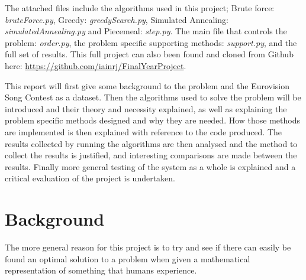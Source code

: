 \documentclass[12pt]{report}
\begin{document}
The attached files include the algorithms used in this project; Brute force: \textit{bruteForce.py}, Greedy: \textit{greedySearch.py}, Simulated Annealing: \textit{simulatedAnnealing.py} and Piecemeal: \textit{step.py}. The main file that controls the problem: \textit{order.py}, the problem specific supporting methods: \textit{support.py}, and the full set of results. This full project can also been found and cloned from Github here: \url{https://github.com/iainrj/FinalYearProject}.

This report will first give some background to the problem and the Eurovision Song Contest as a dataset. Then the algorithms used to solve the problem will be introduced and their theory and necessity explained, as well as explaining the problem specific methods designed and why they are needed. How those methods are implemented is then explained with reference to the code produced. The results collected by running the algorithms are then analysed and the method to collect the results is justified, and interesting comparisons are made between the results. Finally more general testing of the system as a whole is explained and a critical evaluation of the project is undertaken.

\section{Background}\label{Background}
The more general reason for this project is to try and see if there can easily be found an optimal solution to a problem when given a mathematical representation of something that humans experience. 
\end{document}
